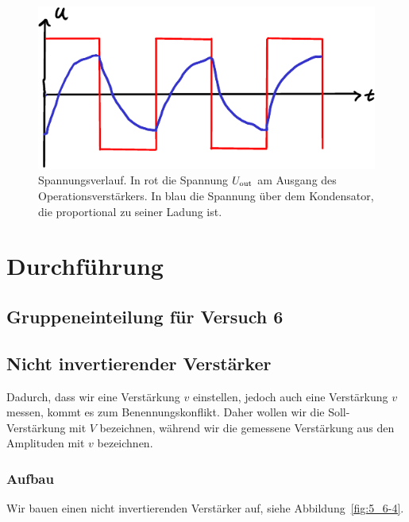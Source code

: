 \begin{figure}[htbp]
	\centering
	\includegraphics{K.pdf}
	\caption{%
		Spannungsverlauf. In rot die Spannung $U_\text{out}$ am Ausgang des
		Operationsverstärkers. In blau die Spannung über dem Kondensator, die
		proportional zu seiner Ladung ist.
	}
	\label{fig:K}
\end{figure}


\FloatBarrier
\section{Durchführung}

\FloatBarrier
\subsection{Gruppeneinteilung für Versuch 6}

\FloatBarrier
\subsection{Nicht invertierender Verstärker}

Dadurch, dass wir eine Verstärkung $v$ einstellen, jedoch auch eine Verstärkung
$v$ messen, kommt es zum Benennungskonflikt. Daher wollen wir die
Soll-Verstärkung mit $V$ bezeichnen, während wir die gemessene Verstärkung aus
den Amplituden mit $v$ bezeichnen.

\subsubsection{Aufbau}

Wir bauen einen nicht invertierenden Verstärker auf, siehe
Abbildung~\ref{fig:5_6-4}. 

